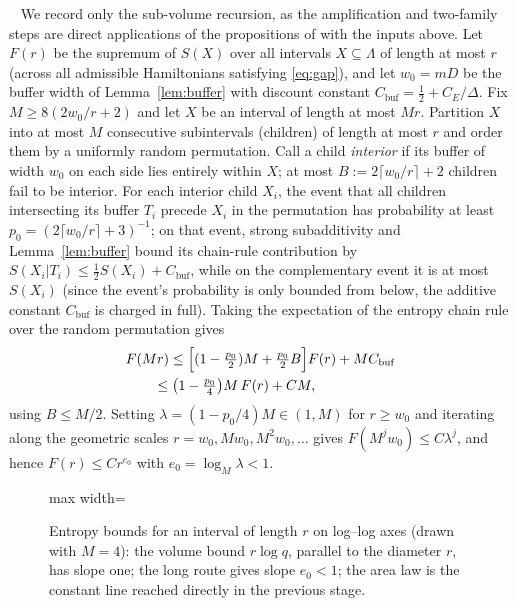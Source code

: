 \documentclass[aps,prx,reprint,superscriptaddress,floatfix,nofootinbib,longbibliography,amsmath,amssymb]{revtex4-2}
\newcommand{\Lam}{\Lambda}
\theoremstyle{plain}
\theoremstyle{definition}
\newcommand{\precisely}{\par\noindent{\bfseries Precisely.}\ }
\begin{document}
\precisely
We record only the sub-volume recursion, as the amplification and
two-family steps are direct applications of the propositions of \cite{AL}
with the inputs above. Let $F(r)$ be the supremum of $S(X)$ over all
intervals $X\subseteq\Lam$ of length at most $r$ (across all admissible
Hamiltonians satisfying \eqref{eq:gap}), and let $w_0=mD$ be the buffer
width of Lemma~\ref{lem:buffer} with discount constant
$C_{\mathrm{buf}}=\frac12+C_E/\Delta$. Fix $M\ge 8(2w_0/r+2)$ and let $X$
be an interval of length at most $Mr$. Partition $X$ into at most $M$
consecutive subintervals (children) of length at most $r$ and order them by
a uniformly random permutation. Call a child \emph{interior} if its buffer
of width $w_0$ on each side lies entirely within $X$; at most
$B:=2\lceil w_0/r\rceil+2$ children fail to be interior. For each interior
child $X_i$, the event that all children intersecting its buffer $T_i$
precede $X_i$ in the permutation has probability at least
$p_0=(2\lceil w_0/r\rceil+3)^{-1}$; on that event, strong subadditivity and
Lemma~\ref{lem:buffer} bound its chain-rule contribution by
$S(X_i|T_i)\le\frac12S(X_i)+C_{\mathrm{buf}}$, while on the complementary
event it is at most $S(X_i)$ (since the event's probability is only bounded
from below, the additive constant $C_{\mathrm{buf}}$ is charged in full).
Taking the expectation of the entropy chain rule over the random
permutation gives
\[
\begin{split}
 &F(Mr)\le\Bigl[(1-\tfrac{p_0}2)M+\tfrac{p_0}2B\Bigr]F(r)+MC_{\mathrm{buf}}\\
 &\qquad\le\bigl(1-\tfrac{p_0}4\bigr)M\,F(r)+C M ,
\end{split}
\]
using $B\le M/2$. Setting $\lambda=(1-p_0/4)M\in(1,M)$ for $r\ge w_0$ and
iterating along the geometric scales $r=w_0,Mw_0,M^2w_0,\dots$ gives
$F(M^jw_0)\le C\lambda^j$, and hence $F(r)\le Cr^{e_0}$ with
$e_0=\log_M\lambda<1$.

\begin{figure}[t]
\centering
\begin{adjustbox}{max width=\linewidth}

\end{adjustbox}
\caption{Entropy bounds for an interval of length $r$ on log–log axes (drawn with $M=4$): the volume bound $r\log q$, parallel to the diameter $r$, has slope one; the long route gives slope $e_0<1$; the area law is the constant line reached directly in the previous stage.}\label{fig:recursion}
\end{figure}
\end{document}
